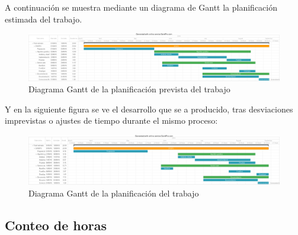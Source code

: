 A continuación se muestra mediante un diagrama de Gantt la planificación estimada del trabajo.

\bigskip
\begin{figure}[h]
	\centering
	\includegraphics[width=1.0\linewidth]{../images/gantt_prevista}
	\caption[Diagrama Gantt de la planificación prevista del trabajo]{Diagrama Gantt de la planificación prevista del trabajo}
	\label{fig:gantt_previsto}
\end{figure}

\bigskip
Y en la siguiente figura se ve el desarrollo que se a producido, tras desviaciones imprevistas o ajustes de tiempo durante el mismo proceso:


\bigskip
\begin{figure}[h]
	\centering
	\includegraphics[width=1.0\linewidth]{../images/gantt}
	\caption[Diagrama Gantt de la planificación del trabajo]{Diagrama Gantt de la planificación del trabajo}
	\label{fig:gantt}
\end{figure}


\bigskip
\subsection{Conteo de horas}
\bigskip


